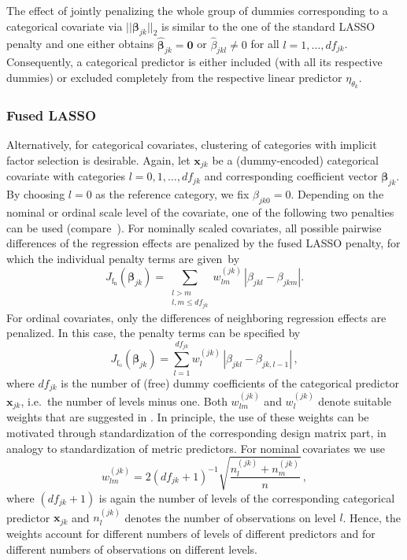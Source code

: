 \documentclass[submit]{smj}
\begin{document}
The effect of jointly penalizing the whole group of dummies corresponding to a categorical covariate via $|| \boldsymbol{\beta}_{jk} ||_2$
is similar to the one of the standard LASSO penalty and one either obtains $\boldsymbol{\hat\beta}_{jk}=\boldsymbol{0}$ or $\hat\beta_{jkl}\neq 0$
for all $l=1,\ldots,df_{jk}$. Consequently, a categorical predictor is either included (with all its respective dummies) or excluded completely from the respective linear predictor $\eta_{\theta_k}$.

\subsubsection*{Fused  LASSO}

\noindent Alternatively, for categorical covariates, clustering of categories with implicit factor selection is desirable. Again, let $\mathbf{x}_{jk}$ be a (dummy-encoded) categorical covariate with categories $l=0,1,\ldots,df_{jk}$ and corresponding coefficient vector $\boldsymbol{\beta}_{jk}$. By choosing $l=0$ as the reference category, we fix $\beta_{jk0}=0$. Depending on the nominal or ordinal scale level of the covariate, one of the following two penalties can be used (compare~\citealp{GerTut:2010}). For nominally scaled covariates, all possible pairwise differences of the regression effects are penalized by the fused LASSO penalty, for which the individual penalty terms are given~by
\begin{equation}\label{eq:fused:lasso:nom}
J_{\text{f}_{\text{n}}}(\boldsymbol{\beta}_{jk})=\sum\limits_{\substack{l>m\\ l,m\leq df_{jk}}} w_{lm}^{(jk)}\, | \beta_{jkl}- \beta_{jkm}|.
\end{equation}
For ordinal covariates, only the differences of neighboring regression effects are penalized. In this case, the penalty terms can be specified by
\begin{equation}\label{eq:fused:lasso:ord}
J_{\text{f}_{\text{o}}}(\boldsymbol{\beta}_{jk})=\sum\limits_{l=1}^{df_{jk}} w_l^{(jk)}\, | \beta_{jkl}- \beta_{jk,l-1}|\,,
\end{equation}
where $df_{jk}$ is the number of (free) dummy coefficients of the categorical predictor $\mathbf{x}_{jk}$, i.e.\ the number of levels minus one. Both $w_{lm}^{(jk)}$ and $w_l^{(jk)}$ denote suitable weights that are suggested in \citet{BonRei:2009}.
In principle, the use of these weights can be motivated through standardization of the corresponding design matrix part, in analogy to standardization of
metric predictors. For nominal covariates we use
$$
w_{lm}^{(jk)} = 2(df_{jk}+1)^{-1}\sqrt{\frac{n_l^{(jk)}+n_m^{(jk)}}{n}} \,,
$$
where  $(df_{jk}+1)$ is again the number of levels of the corresponding categorical predictor $\mathbf{x}_{jk}$ and
$n_l^{(jk)}$ denotes the number of observations on level $l$.
Hence, the weights account for different numbers of levels of different predictors and for different numbers of
observations on different levels.
\end{document}
